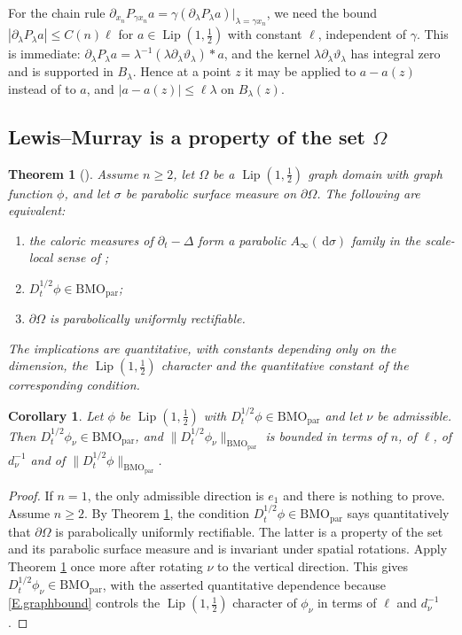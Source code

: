 \documentclass[10pt,a4paper]{amsart}
\numberwithin{equation}{section}
\DeclareMathOperator{\Lip}{Lip}
\newcommand{\abs}[1]{\left\vert#1\right\vert}
\newcommand{\br}[1]{\left(#1\right)}
\newcommand{\om}{\Omega}
\newcommand{\pd}{\partial}
\newcommand{\dhalf}{D_t^{1/2}}
\newcommand{\BMOpar}{\mathrm{BMO}_{\mathrm{par}}}
\renewcommand{\d}{\,\mathrm d}
\newtheorem{theorem}[equation]{Theorem}
\newtheorem{corollary}[equation]{Corollary}
\begin{document}
\noindent For the chain rule
$\pd_{x_n}P_{\gamma x_n}a
=\gamma(\pd_\lambda P_\lambda a)|_{\lambda=\gamma x_n}$,
we need the bound $|\pd_\lambda P_\lambda a|\le C(n)\ell$ for
$a\in\Lip(1,\tfrac12)$ with constant $\ell$, independent of $\gamma$.
This is immediate:
$\pd_\lambda P_\lambda a=\lambda^{-1}\br{\lambda\pd_\lambda\vartheta_\lambda}*a$,
and the kernel $\lambda\pd_\lambda\vartheta_\lambda$ has integral zero and is
supported in $B_\lambda$. Hence at a point $z$ it may be applied to $a-a(z)$
instead of to $a$, and $\abs{a-a(z)}\le\ell\lambda$ on $B_\lambda(z)$.

\subsection{Lewis--Murray is a property of the set $\om$}\label{ss.BHMN}

\begin{theorem}[{\cite[Theorem 1.2]{BHMN}}]\label{T.BHMN}
Assume $n\ge2$, let $\om$ be a $\Lip(1,\tfrac12)$ graph domain with graph
function $\phi$, and let $\sigma$ be parabolic surface measure on $\pd\om$.
The following are equivalent:
\begin{enumerate}
\item the caloric measures of $\pd_t-\Delta$ form a parabolic
  $A_\infty(\d\sigma)$ family in the scale-local sense of
  \cite[Definition 3.18]{BHMN};
\item $\dhalf\phi\in\BMOpar$;
\item $\pd\om$ is parabolically uniformly rectifiable.
\end{enumerate}
The implications are quantitative, with constants depending only on the
dimension, the $\Lip(1,\tfrac12)$ character and the quantitative constant of
the corresponding condition.
\end{theorem}

\begin{corollary}\label{C.BHMN}
Let $\phi$ be $\Lip(1,\tfrac12)$ with $\dhalf\phi\in\BMOpar$ and let $\nu$ be
admissible. Then $\dhalf\phi_\nu\in\BMOpar$, and
$\|\dhalf\phi_\nu\|_{\BMOpar}$ is bounded in terms of $n$, of $\ell$, of
$d_\nu^{-1}$ and of $\|\dhalf\phi\|_{\BMOpar}$.
\end{corollary}

\begin{proof}
If $n=1$, the only admissible direction is $e_1$ and there is nothing to
prove. Assume $n\ge2$. By Theorem \ref{T.BHMN}, the condition
$\dhalf\phi\in\BMOpar$ says quantitatively that $\pd\om$ is parabolically
uniformly rectifiable. The latter is a property of the set and its parabolic
surface measure and is invariant under spatial rotations. Apply Theorem
\ref{T.BHMN} once more after rotating $\nu$ to the vertical direction. This
gives $\dhalf\phi_\nu\in\BMOpar$, with the asserted quantitative dependence
because \eqref{E.graphbound} controls the $\Lip(1,\tfrac12)$ character of
$\phi_\nu$ in terms of $\ell$ and $d_\nu^{-1}$.
\end{proof}
\end{document}
